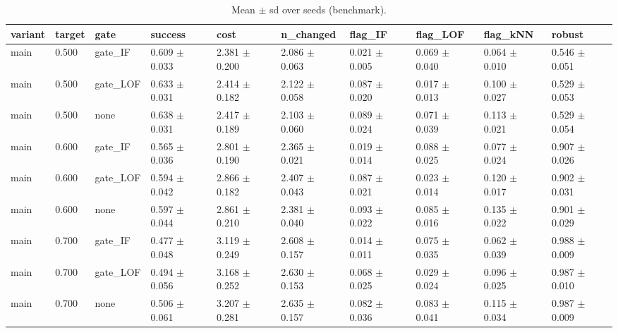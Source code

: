 \begin{table}[t]
\centering
\caption{Mean $\pm$ sd over seeds (benchmark).}
\label{tab:benchmark_summary}
\small
\begin{tabular}{llllllllll}
\toprule
variant & target & gate & success & cost & n\_changed & flag\_IF & flag\_LOF & flag\_kNN & robust \\
\midrule
main & 0.500 & gate\_IF & 0.609 $\pm$ 0.033 & 2.381 $\pm$ 0.200 & 2.086 $\pm$ 0.063 & 0.021 $\pm$ 0.005 & 0.069 $\pm$ 0.040 & 0.064 $\pm$ 0.010 & 0.546 $\pm$ 0.051 \\
main & 0.500 & gate\_LOF & 0.633 $\pm$ 0.031 & 2.414 $\pm$ 0.182 & 2.122 $\pm$ 0.058 & 0.087 $\pm$ 0.020 & 0.017 $\pm$ 0.013 & 0.100 $\pm$ 0.027 & 0.529 $\pm$ 0.053 \\
main & 0.500 & none & 0.638 $\pm$ 0.031 & 2.417 $\pm$ 0.189 & 2.103 $\pm$ 0.060 & 0.089 $\pm$ 0.024 & 0.071 $\pm$ 0.039 & 0.113 $\pm$ 0.021 & 0.529 $\pm$ 0.054 \\
main & 0.600 & gate\_IF & 0.565 $\pm$ 0.036 & 2.801 $\pm$ 0.190 & 2.365 $\pm$ 0.021 & 0.019 $\pm$ 0.014 & 0.088 $\pm$ 0.025 & 0.077 $\pm$ 0.024 & 0.907 $\pm$ 0.026 \\
main & 0.600 & gate\_LOF & 0.594 $\pm$ 0.042 & 2.866 $\pm$ 0.182 & 2.407 $\pm$ 0.043 & 0.087 $\pm$ 0.021 & 0.023 $\pm$ 0.014 & 0.120 $\pm$ 0.017 & 0.902 $\pm$ 0.031 \\
main & 0.600 & none & 0.597 $\pm$ 0.044 & 2.861 $\pm$ 0.210 & 2.381 $\pm$ 0.040 & 0.093 $\pm$ 0.022 & 0.085 $\pm$ 0.016 & 0.135 $\pm$ 0.022 & 0.901 $\pm$ 0.029 \\
main & 0.700 & gate\_IF & 0.477 $\pm$ 0.048 & 3.119 $\pm$ 0.249 & 2.608 $\pm$ 0.157 & 0.014 $\pm$ 0.011 & 0.075 $\pm$ 0.035 & 0.062 $\pm$ 0.039 & 0.988 $\pm$ 0.009 \\
main & 0.700 & gate\_LOF & 0.494 $\pm$ 0.056 & 3.168 $\pm$ 0.252 & 2.630 $\pm$ 0.153 & 0.068 $\pm$ 0.025 & 0.029 $\pm$ 0.024 & 0.096 $\pm$ 0.025 & 0.987 $\pm$ 0.010 \\
main & 0.700 & none & 0.506 $\pm$ 0.061 & 3.207 $\pm$ 0.281 & 2.635 $\pm$ 0.157 & 0.082 $\pm$ 0.036 & 0.083 $\pm$ 0.041 & 0.115 $\pm$ 0.034 & 0.987 $\pm$ 0.009 \\
\bottomrule
\end{tabular}
\end{table}

